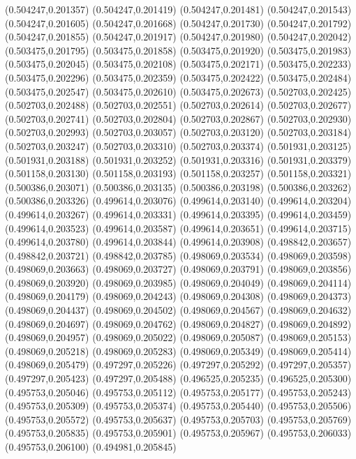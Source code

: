 (0.504247,0.201357)
(0.504247,0.201419)
(0.504247,0.201481)
(0.504247,0.201543)
(0.504247,0.201605)
(0.504247,0.201668)
(0.504247,0.201730)
(0.504247,0.201792)
(0.504247,0.201855)
(0.504247,0.201917)
(0.504247,0.201980)
(0.504247,0.202042)
(0.503475,0.201795)
(0.503475,0.201858)
(0.503475,0.201920)
(0.503475,0.201983)
(0.503475,0.202045)
(0.503475,0.202108)
(0.503475,0.202171)
(0.503475,0.202233)
(0.503475,0.202296)
(0.503475,0.202359)
(0.503475,0.202422)
(0.503475,0.202484)
(0.503475,0.202547)
(0.503475,0.202610)
(0.503475,0.202673)
(0.502703,0.202425)
(0.502703,0.202488)
(0.502703,0.202551)
(0.502703,0.202614)
(0.502703,0.202677)
(0.502703,0.202741)
(0.502703,0.202804)
(0.502703,0.202867)
(0.502703,0.202930)
(0.502703,0.202993)
(0.502703,0.203057)
(0.502703,0.203120)
(0.502703,0.203184)
(0.502703,0.203247)
(0.502703,0.203310)
(0.502703,0.203374)
(0.501931,0.203125)
(0.501931,0.203188)
(0.501931,0.203252)
(0.501931,0.203316)
(0.501931,0.203379)
(0.501158,0.203130)
(0.501158,0.203193)
(0.501158,0.203257)
(0.501158,0.203321)
(0.500386,0.203071)
(0.500386,0.203135)
(0.500386,0.203198)
(0.500386,0.203262)
(0.500386,0.203326)
(0.499614,0.203076)
(0.499614,0.203140)
(0.499614,0.203204)
(0.499614,0.203267)
(0.499614,0.203331)
(0.499614,0.203395)
(0.499614,0.203459)
(0.499614,0.203523)
(0.499614,0.203587)
(0.499614,0.203651)
(0.499614,0.203715)
(0.499614,0.203780)
(0.499614,0.203844)
(0.499614,0.203908)
(0.498842,0.203657)
(0.498842,0.203721)
(0.498842,0.203785)
(0.498069,0.203534)
(0.498069,0.203598)
(0.498069,0.203663)
(0.498069,0.203727)
(0.498069,0.203791)
(0.498069,0.203856)
(0.498069,0.203920)
(0.498069,0.203985)
(0.498069,0.204049)
(0.498069,0.204114)
(0.498069,0.204179)
(0.498069,0.204243)
(0.498069,0.204308)
(0.498069,0.204373)
(0.498069,0.204437)
(0.498069,0.204502)
(0.498069,0.204567)
(0.498069,0.204632)
(0.498069,0.204697)
(0.498069,0.204762)
(0.498069,0.204827)
(0.498069,0.204892)
(0.498069,0.204957)
(0.498069,0.205022)
(0.498069,0.205087)
(0.498069,0.205153)
(0.498069,0.205218)
(0.498069,0.205283)
(0.498069,0.205349)
(0.498069,0.205414)
(0.498069,0.205479)
(0.497297,0.205226)
(0.497297,0.205292)
(0.497297,0.205357)
(0.497297,0.205423)
(0.497297,0.205488)
(0.496525,0.205235)
(0.496525,0.205300)
(0.495753,0.205046)
(0.495753,0.205112)
(0.495753,0.205177)
(0.495753,0.205243)
(0.495753,0.205309)
(0.495753,0.205374)
(0.495753,0.205440)
(0.495753,0.205506)
(0.495753,0.205572)
(0.495753,0.205637)
(0.495753,0.205703)
(0.495753,0.205769)
(0.495753,0.205835)
(0.495753,0.205901)
(0.495753,0.205967)
(0.495753,0.206033)
(0.495753,0.206100)
(0.494981,0.205845)
